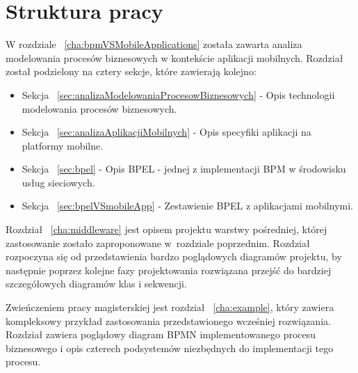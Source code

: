 \section{Struktura pracy}
\label{sec:strukturaPracy}

W rozdziale ~\ref{cha:bpmVSMobileApplications} została zawarta analiza modelowania procesów biznesowych w kontekście aplikacji mobilnych. Rozdział został podzielony na cztery sekcje, które zawierają kolejno:
\begin{itemize}
\item Sekcja ~\ref{sec:analizaModelowaniaProcesowBiznesowych} - Opis technologii modelowania procesów biznesowych.
\item Sekcja ~\ref{sec:analizaAplikacjiMobilnych} - Opis specyfiki aplikacji na platformy mobilne.
\item Sekcja ~\ref{sec:bpel} - Opis BPEL - jednej z implementacji BPM w środowisku usług sieciowych. 
\item Sekcja ~\ref{sec:bpelVSmobileApp} - Zestawienie BPEL z aplikacjami mobilnymi.
\end{itemize}

Rozdział ~\ref{cha:middleware} jest opisem projektu warstwy pośredniej, której zastosowanie zostało zaproponowane w~rozdziale poprzednim. Rozdział rozpoczyna się od przedstawienia bardzo poglądowych diagramów projektu, by następnie poprzez kolejne fazy projektowania rozwiązana przejść do bardziej szczegółowych diagramów klas i sekwencji. 

Zwieńczeniem pracy magisterskiej jest rozdział ~\ref{cha:example}, który zawiera kompleksowy przykład zastosowania przedstawionego wcześniej rozwiązania. Rozdział zawiera poglądowy diagram BPMN implementowanego procesu biznesowego i opis czterech podsystemów niezbędnych do implementacji tego procesu.
